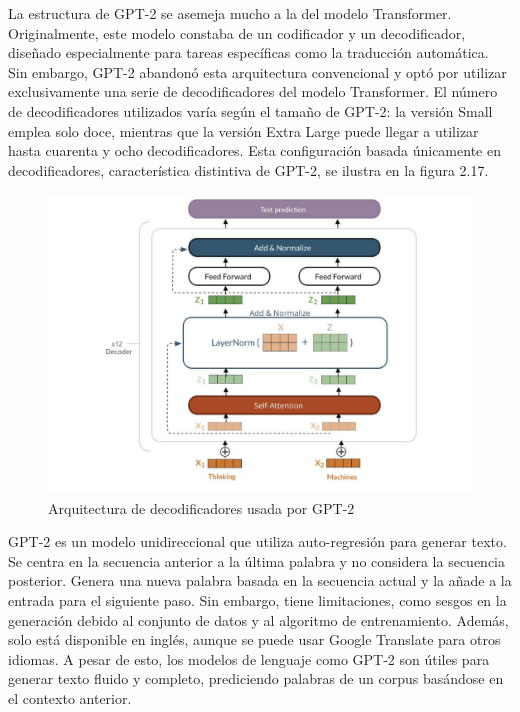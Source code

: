 La estructura de GPT-2 se asemeja mucho a la del modelo Transformer. Originalmente, este modelo constaba de un codificador y un decodificador, diseñado especialmente para tareas específicas como la traducción automática. Sin embargo, GPT-2 abandonó esta arquitectura convencional y optó por utilizar exclusivamente una serie de decodificadores del modelo Transformer. El número de decodificadores utilizados varía según el tamaño de GPT-2: la versión Small emplea solo doce, mientras que la versión Extra Large puede llegar a utilizar hasta cuarenta y ocho decodificadores. Esta configuración basada únicamente en decodificadores, característica distintiva de GPT-2, se ilustra en la figura 2.17.

\begin{figure}[h]
	\centering
	\includegraphics[scale=0.5]{Imagenes/gpt2_architecture}
	\caption{Arquitectura de decodificadores usada por GPT-2 \cite{cristinaalameda}}
	\label{fig:gpt2_architecture}
\end{figure}

GPT-2 es un modelo unidireccional que utiliza auto-regresión para generar texto. Se centra en la secuencia anterior a la última palabra y no considera la secuencia posterior. Genera una nueva palabra basada en la secuencia actual y la añade a la entrada para el siguiente paso. Sin embargo, tiene limitaciones, como sesgos en la generación debido al conjunto de datos y al algoritmo de entrenamiento. Además, solo está disponible en inglés, aunque se puede usar Google Translate para otros idiomas. A pesar de esto, los modelos de lenguaje como GPT-2 son útiles para generar texto fluido y completo, prediciendo palabras de un corpus basándose en el contexto anterior.
 
